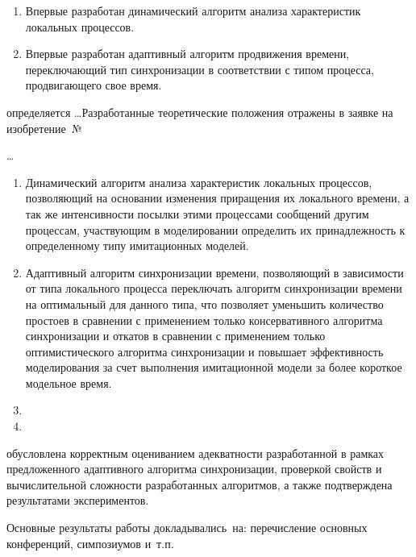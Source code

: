 {\novelty}
\begin{enumerate}
  \item Впервые разработан динамический алгоритм анализа характеристик локальных процессов.
  \item Впервые разработан адаптивный алгоритм продвижения времени, переключающий тип синхронизации в соответствии с типом процесса, продвигающего свое время.
\end{enumerate}

{\influence} определяется \ldots Разработанные теоретические положения отражены в заявке на изобретение~№

{\methods} \ldots

{}
\begin{enumerate}
  \item Динамический алгоритм анализа характеристик локальных процессов, позволяющий на основании изменения приращения их локального времени, а так же интенсивности посылки этими процессами сообщений другим процессам, участвующим в моделировании определить их принадлежность к определенному типу имитационных моделей.
  \item Адаптивный алгоритм синхронизации времени, позволяющий в зависимости от типа локального процесса переключать алгоритм синхронизации времени на оптимальный для данного типа, что позволяет уменьшить количество простоев в сравнении с применением только консервативного алгоритма синхронизации и откатов в сравнении с применением только оптимистического алгоритма синхронизации и повышает эффективность моделирования за счет выполнения имитационной модели за более короткое модельное время.
  \item {}
  \item {}
\end{enumerate}


{\reliability} обусловлена корректным оцениванием адекватности разработанной в рамках предложенного адаптивного алгоритма синхронизации, проверкой
свойств и вычислительной сложности разработанных алгоритмов, а также подтверждена результатами экспериментов.


{\probation}
Основные результаты работы докладывались~на:
перечисление основных конференций, симпозиумов и~т.\:п.

